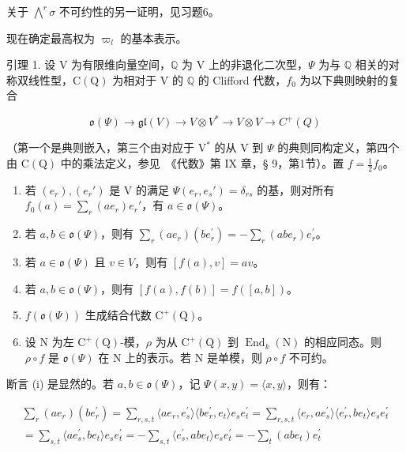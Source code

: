 关于 \(\bigwedge^{r}\sigma\) 不可约性的另一证明，见习题6。

现在确定最高权为 \(\varpi_{l}\) 的基本表示。

引理 1. 设 \(\mathrm{V}\) 为有限维向量空间，\(\mathbb{Q}\) 为 \(\mathrm{V}\) 上的非退化二次型，\(\Psi\) 为与 \(\mathbb{Q}\) 相关的对称双线性型，\(\mathrm{C(Q)}\) 为相对于 \(\mathrm{V}\) 的 \(\mathbb{Q}\) 的 Clifford 代数，\(f_0\) 为以下典则映射的复合

\[
\mathfrak {o} (\Psi) \longrightarrow \mathfrak {g l} (V) \longrightarrow V \otimes V ^ {*} \longrightarrow V \otimes V \longrightarrow C ^ {+} (Q)
\]

（第一个是典则嵌入，第三个由对应于 \(\mathrm{V}^*\) 的从 \(\mathrm{V}\) 到 \(\Psi\) 的典则同构定义，第四个由 \(\mathrm{C(Q)}\) 中的乘法定义，参见~《代数》第 IX 章，§ 9，第1节）。置 \(f = \frac{1}{2} f_0\)。

\begin{enumerate}
\def\labelenumi{(\roman{enumi})}
\item
  若 \((e_r), (e_r')\) 是 V 的满足 \(\Psi(e_r, e_s') = \delta_{rs}\) 的基，则对所有 \(f_0(a) = \sum_r (ae_r)e_r'\)，有 \(a \in \mathfrak{o}(\Psi)\)。
\item
  若 \(a, b \in \mathfrak{o}(\Psi)\)，则有 \(\sum_{r}(ae_{r})(be_{r}^{\prime}) = -\sum_{r}(abe_{r})e_{r}^{\prime}\)。
\item
  若 \(a \in \mathfrak{o}(\varPsi)\) 且 \(v \in V\)，则有 \([f(a), v] = av\)。
\item
  若 \(a, b \in \mathfrak{o}(\varPsi)\)，则有 \([f(a), f(b)] = f([a, b])\)。
\item
  \(f(\mathfrak{o}(\Psi))\) 生成结合代数 \(\mathrm{C}^{+}(\mathrm{Q})\)。
\item
  设 \(\mathrm{N}\) 为左 \(\mathrm{C}^{+}(\mathrm{Q})\)-模，\(\rho\) 为从 \(\mathrm{C}^{+}(\mathrm{Q})\) 到 \(\operatorname{End}_k(\mathrm{N})\) 的相应同态。则 \(\rho \circ f\) 是 \(\mathfrak{o}(\Psi)\) 在 \(\mathrm{N}\) 上的表示。若 \(\mathrm{N}\) 是单模，则 \(\rho \circ f\) 不可约。
\end{enumerate}

断言 (i) 是显然的。若 \(a, b \in \mathfrak{o}(\varPsi)\)，记 \(\varPsi(x,y) = \langle x,y\rangle\)，则有：

\[
\begin{array}{c} \sum_ {r} (a e _ {r}) (b e _ {r} ^ {\prime}) = \sum_ {r, s, t} \langle a e _ {r}, e _ {s} ^ {\prime} \rangle \langle b e _ {r} ^ {\prime}, e _ {t} \rangle e _ {s} e _ {t} ^ {\prime} = \sum_ {r, s, t} \langle e _ {r}, a e _ {s} ^ {\prime} \rangle \langle e _ {r} ^ {\prime}, b e _ {t} \rangle e _ {s} e _ {t} ^ {\prime} \\ = \sum_ {s, t} \langle a e _ {s} ^ {\prime}, b e _ {t} \rangle e _ {s} e _ {t} ^ {\prime} = - \sum_ {s, t} \langle e _ {s} ^ {\prime}, a b e _ {t} \rangle e _ {s} e _ {t} ^ {\prime} = - \sum_ {t} (a b e _ {t}) e _ {t} ^ {\prime} \end{array}
\]

